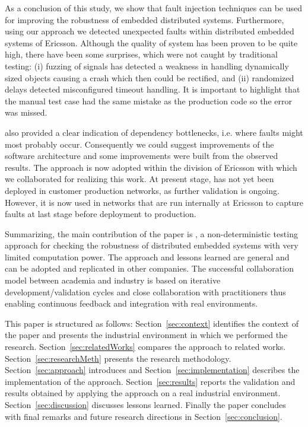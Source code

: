 As a conclusion of this study, we show that fault injection techniques can be used for improving the robustness of embedded distributed
systems. Furthermore, using our approach we detected unexpected faults within distributed embedded systems of Ericsson. 
Although the quality of system has been proven to be quite high, there have been some surprises, which were not caught by traditional testing: (i) fuzzing of signals has detected a weakness in handling dynamically sized objects causing a crash which then could be rectified, and (ii) randomized delays detected misconfigured timeout handling. It is important to highlight that the manual test case had the same mistake as the production code so the error was missed.

\approach{} also provided a clear indication of dependency bottlenecks, i.e. where faults might most probably occur. Consequently we could suggest improvements of the software architecture and some %
improvements
were built from the observed results. The approach is now adopted within the division of Ericsson with which we collaborated for realizing this work. 
 At present stage, \approach{} has not yet been deployed in customer production networks, as further validation is ongoing. However, it is now used in networks that are run internally at Ericsson to capture faults at last stage before deployment to production. 
 
Summarizing, the main contribution of the paper is \approach{}, a non-deterministic testing approach for checking the robustness of distributed embedded systems with very limited computation power. The approach and lessons learned are general and can be adopted and replicated in other companies.
The successful collaboration model between academia and industry is based on iterative development/validation cycles and close collaboration with practitioners thus enabling continuous feedback and integration with real environments. 

This paper is structured as follows: Section~\ref{sec:context} identifies the context of the paper and presents the industrial environment in which we performed the research. Section~\ref{sec:relatedWorks} compares the approach to related works. Section~\ref{sec:researchMeth} presents the research methodology. Section~\ref{sec:approach} introduces  %
\approach{} and Section~\ref{sec:implementation} describes the implementation of the approach. Section~\ref{sec:results} reports the validation and results obtained by applying the approach on a real industrial environment. Section~\ref{sec:discussion} discusses lessons learned. Finally the paper concludes with final remarks and future research directions in Section~\ref{sec:conclusion}.

